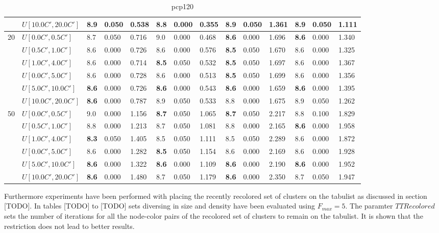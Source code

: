 \begin{table}[h]
{\begin{tabular}{|l|l||l|l|l||l|l|l||l|l|l||l|l|l|}
       & $U[10.0C',20.0C']$ & 8.9 & 0.050 & 0.538 & \textbf{8.8} & 0.000 & 0.355 & 8.9 & 0.050 & 1.361 & 8.9 & 0.050 & 1.111 \\
      \hline\hline
      \multirow{6}{*}{20} & $U[0.0C',0.5C']$ & 8.7 & 0.050 & 0.716 & 9.0 & 0.000 & 0.468 & \textbf{8.6} & 0.000 & 1.696 & \textbf{8.6} & 0.000 & 1.340 \\
       & $U[0.5C',1.0C']$ & 8.6 & 0.000 & 0.726 & 8.6 & 0.000 & 0.576 & \textbf{8.5} & 0.050 & 1.670 & 8.6 & 0.000 & 1.325 \\
       & $U[1.0C',4.0C']$ & 8.6 & 0.000 & 0.714 & \textbf{8.5} & 0.050 & 0.532 & \textbf{8.5} & 0.050 & 1.697 & 8.6 & 0.000 & 1.367 \\
       & $U[0.0C',5.0C']$ & 8.6 & 0.000 & 0.728 & 8.6 & 0.000 & 0.513 & \textbf{8.5} & 0.050 & 1.699 & 8.6 & 0.000 & 1.356 \\
       & $U[5.0C',10.0C']$ & \textbf{8.6} & 0.000 & 0.726 & \textbf{8.6} & 0.000 & 0.543 & \textbf{8.6} & 0.000 & 1.659 & \textbf{8.6} & 0.000 & 1.395 \\
       & $U[10.0C',20.0C']$ & \textbf{8.6} & 0.000 & 0.787 & 8.9 & 0.050 & 0.533 & 8.8 & 0.000 & 1.675 & 8.9 & 0.050 & 1.262 \\
      \hline\hline
      \multirow{6}{*}{50} & $U[0.0C',0.5C']$ & 9.0 & 0.000 & 1.156 & \textbf{8.7} & 0.050 & 1.065 & \textbf{8.7} & 0.050 & 2.217 & 8.8 & 0.100 & 1.829 \\
       & $U[0.5C',1.0C']$ & 8.8 & 0.000 & 1.213 & 8.7 & 0.050 & 1.081 & 8.8 & 0.000 & 2.165 & \textbf{8.6} & 0.000 & 1.958 \\
       & $U[1.0C',4.0C']$ & \textbf{8.3} & 0.050 & 1.405 & 8.5 & 0.050 & 1.111 & 8.5 & 0.050 & 2.289 & 8.6 & 0.000 & 1.872 \\
       & $U[0.0C',5.0C']$ & 8.6 & 0.000 & 1.282 & \textbf{8.5} & 0.050 & 1.154 & 8.6 & 0.000 & 2.169 & 8.6 & 0.000 & 1.928 \\
       & $U[5.0C',10.0C']$ & \textbf{8.6} & 0.000 & 1.322 & \textbf{8.6} & 0.000 & 1.109 & \textbf{8.6} & 0.000 & 2.190 & \textbf{8.6} & 0.000 & 1.952 \\
       & $U[10.0C',20.0C']$ & \textbf{8.6} & 0.000 & 1.480 & 8.7 & 0.050 & 1.179 & \textbf{8.6} & 0.000 & 2.350 & 8.7 & 0.050 & 1.947 \\
      \hline
      \end{tabular}
      }
      \caption{pcp120}
      \label{tab:pcp120}\end{table}

Furthermore experiments have been performed with placing the recently recolored set of clusters on the tabulist as discussed in section [TODO]. In tables [TODO] to [TODO] sets diversing in size and density have been evaluated using $F_{max}=5$. The paramter $TTRecolored$ sets the number of iterations for all the node-color pairs of the recolored set of clusters to remain on the tabulist. It is shown that the restriction does not lead to better results.

